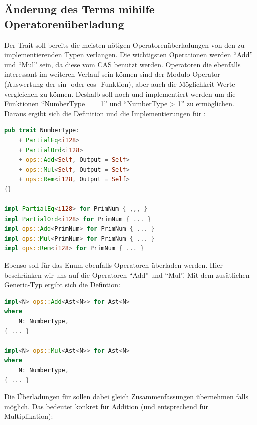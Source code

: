 \documentclass[11pt,a4paper, ngerman]{article}
\begin{document}
\subsection{Änderung des Terms mihilfe Operatorenüberladung}
Der Trait  soll bereits die meisten nötigen Operatorenüberladungen von den zu implementierenden Typen verlangen. Die wichtigsten Operationen werden ``Add'' und ``Mul'' sein, da diese vom CAS benutzt werden. Operatoren die ebenfalls interessant im weiteren Verlauf sein können sind der Modulo-Operator (Auswertung der sin- oder cos- Funktion), aber auch die Möglichkeit Werte vergleichen zu können. Deshalb soll noch  und  implementiert werden um die Funktionen ``NumberType == 1'' und ``NumberType > 1'' zu ermöglichen. Daraus ergibt sich die Definition und die Implementierungen für :

\begin{lstlisting}[language=rust, caption={trait NumberType 1. Iteration}]
pub trait NumberType:
    + PartialEq<i128>
    + PartialOrd<i128>
    + ops::Add<Self, Output = Self>
    + ops::Mul<Self, Output = Self>
    + ops::Rem<i128, Output = Self>
{}

impl PartialEq<i128> for PrimNum { ,,, }
impl PartialOrd<i128> for PrimNum { ... }
impl ops::Add<PrimNum> for PrimNum { ... }
impl ops::Mul<PrimNum> for PrimNum { ... }
impl ops::Rem<i128> for PrimNum { ... }
\end{lstlisting}

Ebenso soll für das Enum  ebenfalls Operatoren überladen werden. Hier beschränken wir uns auf die Operatoren ``Add'' und ``Mul''. Mit dem zusätlichen Generic-Typ ergibt sich die Defintion:

\begin{lstlisting}[language=rust, caption={Ast Operatorenüberladung}]
impl<N> ops::Add<Ast<N>> for Ast<N>
where
    N: NumberType,
{ ... }

impl<N> ops::Mul<Ast<N>> for Ast<N>
where
    N: NumberType,
{ ... }
\end{lstlisting}

Die Überladungen für  sollen dabei gleich Zusammenfassungen übernehmen falls möglich. Das bedeutet konkret für Addition (und entsprechend für Multiplikation):
\end{document}

